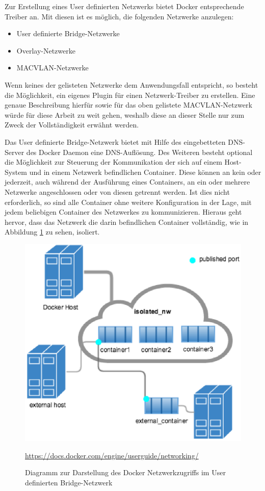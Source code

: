 Zur Erstellung eines User definierten Netzwerks bietet Docker entsprechende Treiber an.
Mit diesen ist es möglich, die folgenden Netzwerke anzulegen:

\begin{itemize}
	\item User definierte Bridge-Netzwerke
	\item Overlay-Netzwerke
	\item MACVLAN-Netzwerke
\end{itemize}

Wenn keines der gelisteten Netzwerke dem Anwendungsfall entspricht, so besteht die Möglichkeit, ein eigenes Plugin für einen Netzwerk-Treiber zu erstellen.
Eine genaue Beschreibung hierfür sowie für das oben gelistete MACVLAN-Netzwerk würde für diese Arbeit zu weit gehen, weshalb diese an dieser Stelle nur zum Zweck der Vollständigkeit erwähnt werden.

Das User definierte Bridge-Netzwerk bietet mit Hilfe des eingebetteten DNS-Server des Docker Daemon eine DNS-Auflösung.
Des Weiteren besteht optional die Möglichkeit zur Steuerung der Kommunikation der sich auf einem Host-System und in einem Netzwerk befindlichen Container.
Diese können an kein oder jederzeit, auch während der Ausführung eines Containers, an ein oder mehrere Netzwerke angeschlossen oder von diesen getrennt werden.
Ist dies nicht erforderlich, so sind alle Container ohne weitere Konfiguration in der Lage, mit jedem beliebigen Container des Netzwerkes zu kommunizieren.
Hieraus geht hervor, dass das Netzwerk die darin befindlichen Container vollständig, wie in Abbildung \ref{fig:dockerportpuex} zu sehen, isoliert.

\begin{figure}[H]
	\centering
	\includegraphics[width=0.7\linewidth]{figures/DockerPortPuEx}
	\caption[Docker Netzwerkzugriff]{Diagramm zur Darstellung des Docker Netzwerkzugriffs im User definierten Bridge-Netzwerk}
	\label{fig:dockerportpuex}
	\tiny{\quelle\url{https://docs.docker.com/engine/userguide/networking/}}
\end{figure}


